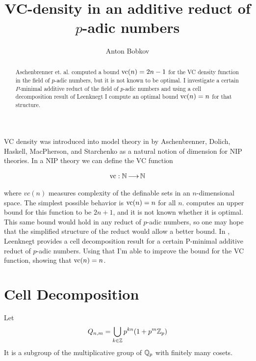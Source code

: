 \documentclass{amsart}
\title{VC-density in an additive reduct of $p$-adic numbers}
\author{Anton Bobkov}
\begin{document}
\begin{abstract}
        Aschenbrenner et. al. computed a bound $\operatorname{vc}(n) = 2n - 1$ for the VC density function in the field of $p$-adic numbers,
        but it is not known to be optimal.
	I investigate a certain $P$-minimal additive reduct of the field of $p$-adic numbers and
        using a cell decomposition result of Leenknegt I compute an optimal bound $\operatorname{vc}(n) = n$ for that structure.
\end{abstract}


\maketitle

VC density was introduced into model theory in \cite{density} by Aschenbrenner, Dolich, Haskell, MacPherson, and Starchenko as a natural notion of dimension for NIP theories.
In a NIP theory we can define the VC function

\begin{align*}
	\operatorname{vc} : \mathbb{N} \operatorname{\longrightarrow} \mathbb{N}
\end{align*}

where $vc(n)$ measures complexity of the definable sets in an $n$-dimensional space.
The simplest possible behavior is $\operatorname{vc}(n) = n$ for all $n$.
\cite{density} computes an upper bound for this function to be $2n+1$, and it is not known whether it is optimal.
This same bound would hold in any reduct of $p$-adic numbers, so one may hope that the simplified structure of the reduct would allow a better bound.
In \cite{reduct}, Leenknegt provides a cell decomposition result for a certain P-minimal additive reduct of $p$-adic numbers.
Using that I'm able to improve the bound for the VC function, showing that $\operatorname{vc}(n) = n$.


\section{Cell Decomposition}


\begin{Definition}
	Let
	\begin{align*}
		Q_{n,m} = \bigcup_{k \in \mathbb{Z}} p^{kn} (1 + p^m\mathbb{Z}_p) 
	\end{align*}
	It is a subgroup of the multiplicative group of $\mathbb{Q}_p$ with finitely many cosets.
\end{Definition}
\end{document}
